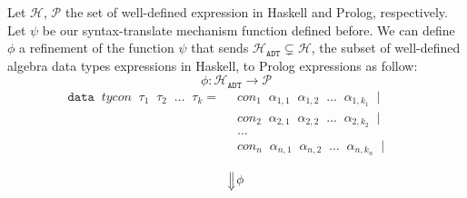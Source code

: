 \documentclass{report}
\theoremstyle{definition}
\theoremstyle{definition}
\newcommand{\ttt}[1]{\texttt{#1}}
\newcommand{\tav}{\;\;}
\newcommand{\SLongdownarrow}{\mathrel{\rotatebox[origin=c]{-90}{$\Longrightarrow$}}}
\begin{document}
Let $\mathcal{H}$, $\mathcal{P}$ the set of well-defined expression in Haskell and Prolog, respectively. Let $\psi$ be our syntax-translate mechanism function defined before. We can define $\phi$ a refinement of the function $\psi$ that sends $\mathcal{H}_{\ttt{ADT}} \subsetneq \mathcal{H}$, the subset of well-defined algebra data types expressions in Haskell, to Prolog expressions as follow: $$\phi: \mathcal{H}_{\ttt{ADT}} \longrightarrow \mathcal{P} $$
\begin{align*}
	\ttt{data} \tav tycon \tav \tau_1 \tav \tau_2 \tav \ldots \tav \tau_k 	=& \tav con_1 \tav \alpha_{1,1} \tav \alpha_{1,2} \tav \ldots \tav \alpha_{1,k_1} \tav | && \\
	& \tav con_2 \tav \alpha_{2,1} \tav \alpha_{2,2} \tav \ldots \tav \alpha_{2,k_2} \tav | && \\
	& \tav \ldots \tav && \\
	& \tav con_n \tav \alpha_{n,1} \tav \alpha_{n,2} \tav \ldots \tav \alpha_{n,k_n} \tav | && \\
\end{align*}
$$\SLongdownarrow \phi$$
\end{document}
